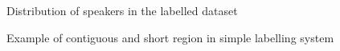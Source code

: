 \documentclass[ %
                    author={Sam Phippen},
                supervisor={Dr. Rafal Bogacz},
                     title={Real time voice activity detectors in noisy personal computing environments},
                  subtitle={},
                    degree={MEng},
                      year={2012} ]{thesis}
\begin{document}
\begin{figure}
    \caption{Distribution of speakers in the labelled dataset}
    \label{img:speaker_distribution}
\end{figure}

\begin{figure}
    \caption{Example of contiguous and short region in simple labelling system}
    \label{img:labelling_example}
\end{figure}
\end{document}
